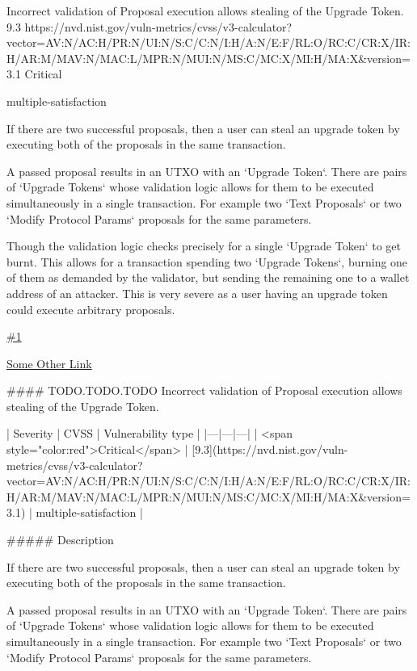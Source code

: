\vuln
    { %
    Incorrect validation of Proposal execution allows stealing of the Upgrade Token.
    }
    { %
      9.3
    }
    { %
    https://nvd.nist.gov/vuln-metrics/cvss/v3-calculator?vector=AV:N/AC:H/PR:N/UI:N/S:C/C:N/I:H/A:N/E:F/RL:O/RC:C/CR:X/IR:H/AR:M/MAV:N/MAC:L/MPR:N/MUI:N/MS:C/MC:X/MI:H/MA:X&version=3.1
    }
    { %
    Critical
    }
    { %
    \item multiple-satisfaction
    }
    { %
    If there are two successful proposals, then a user can steal an upgrade token by executing both of the proposals in the same transaction. 

    A passed proposal results in an UTXO with an `Upgrade Token`. There are pairs of `Upgrade Tokens` whose validation logic allows for them to be executed simultaneously in a single transaction. For example two `Text Proposals` or two `Modify Protocol Params` proposals for the same parameters.
    
    Though the validation logic checks precisely for a single `Upgrade Token` to get burnt. This allows for a transaction spending two `Upgrade Tokens`, burning one of them as demanded by the validator, but sending the remaining one to a wallet address of an attacker. This is very severe as a user having an upgrade token could execute arbitrary proposals.
    }
    { %
      \lipsum[1]
    }
    { %
      \lipsum[1]
    }
    { %
    \item\href{github.com}{\#1}
    \item\href{github.com}{Some Other Link}
    }



#### TODO.TODO.TODO Incorrect validation of Proposal execution allows stealing of the Upgrade Token.

| Severity | CVSS | Vulnerability type |
|---|---|---|
| <span style="color:red">Critical</span> | [9.3](https://nvd.nist.gov/vuln-metrics/cvss/v3-calculator?vector=AV:N/AC:H/PR:N/UI:N/S:C/C:N/I:H/A:N/E:F/RL:O/RC:C/CR:X/IR:H/AR:M/MAV:N/MAC:L/MPR:N/MUI:N/MS:C/MC:X/MI:H/MA:X&version=3.1) | multiple-satisfaction |

##### Description

If there are two successful proposals, then a user can steal an upgrade token by executing both of the proposals in the same transaction. 

A passed proposal results in an UTXO with an `Upgrade Token`. There are pairs of `Upgrade Tokens` whose validation logic allows for them to be executed simultaneously in a single transaction. For example two `Text Proposals` or two `Modify Protocol Params` proposals for the same parameters.

